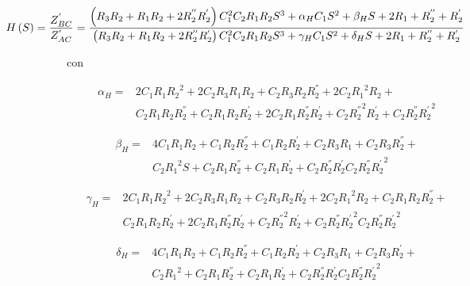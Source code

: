 \documentclass[a4paper]{article}
\begin{document}
\begin{equation} \hspace*{-2cm}
	H \left( S \right) = \frac{Z_{BC}^{'}}{Z_{AC}^{'}} = 
	\frac{ \left( R_{3} R_{2} + R_{1} R_{2} + 2 R_{2}^{''} R_{2}^{'} \right) C_{1}^{2} C_{2}
	R_{1} R_{2} S^{3} + \alpha_H C_{1} S^{2} + \beta_H S + 2 R_{1} + R_{2}^{''} + R_{2}^{'}}
	{\left( R_{3} R_{2} + R_{1} R_{2} + 2 R_{2}^{''} R_{2}^{'} \right)
	C_{1}^{2} C_{2} R_{1} R_{2} S^{3} + \gamma_H C_{1} S^{2} + \delta_H S +
	2 R_{1} + R_{2}^{''} + R_{2}^{'}}
\end{equation}

con

\begin{equation}
\begin{split}
	\alpha_H =& 2 C_{1} R_{1} {R_{2}}^{2} + 2 C_{2} R_{3} R_{1} R_{2} + 
	C_{2} R_{3} R_{2} R_{2}^{''} + 2 C_{2} {R_{1}}^{2} R_{2} + \\
	&C_{2} R_{1} R_{2} R_{2}^{''} + C_{2} R_{1} R_{2} R_{2}^{'} + 
	2 C_{2} R_{1} R_{2}^{''} R_{2}^{'} + C_{2} {R_{2}^{''}}^{2} R_{2}^{'} +
	C_{2} R_{2}^{''} {R_{2}^{'}}^{2}
\end{split}
\end{equation}

\begin{equation}
\begin{split}
	\beta_H =& 4 C_{1} R_{1} R_{2} + C_{1} R_{2} R_{2}^{''} + C_{1} R_{2} R_{2}^{'} + 
	C_{2} R_{3} R_{1} +	C_{2} R_{3} R_{2}^{''} +\\
	&C_{2} {R_{1}}^{2} S +
	C_{2} R_{1} R_{2}^{''} + C_{2} R_{1} R_{2}^{'} + C_{2} R_{2}^{''} R_{2}^{'}
	C_{2} R_{2}^{''} {R_{2}^{'}}^{2}
\end{split}
\end{equation}

\begin{equation}
\begin{split}
	\gamma_H =& 2 C_{1} R_{1} {R_{2}}^{2} + 2 C_{2} R_{3} R_{1} R_{2} +
	C_{2} R_{3} R_{2} R_{2}^{'} + 2 C_{2} {R_{1}}^{2} R_{2} + C_{2} R_{1} R_{2} R_{2}^{''} +\\
	&C_{2} R_{1} R_{2} R_{2}^{'} + 2 C_{2} R_{1} R_{2}^{''} R_{2}^{'} + C_{2} {R_{2}^{''}}^{2} R_{2}^{'} + C_{2} R_{2}^{''} {R_{2}^{'}}^{2}
	C_{2} R_{2}^{''} {R_{2}^{'}}^{2}
\end{split}
\end{equation}

\begin{equation}
\begin{split}
	\delta_H =& 4 C_{1} R_{1} R_{2} + C_{1} R_{2} R_{2}^{''} + C_{1} R_{2} R_{2}^{'} +
	C_{2} R_{3} R_{1} + C_{2} R_{3} R_{2}^{'} +\\
	&C_{2} {R_{1}}^{2} + C_{2} R_{1} R_{2}^{''} + C_{2} R_{1} R_{2}^{'} + C_{2} R_{2}^{''} R_{2}^{'}
	C_{2} R_{2}^{''} {R_{2}^{'}}^{2}
\end{split}
\end{equation}
\end{document}
